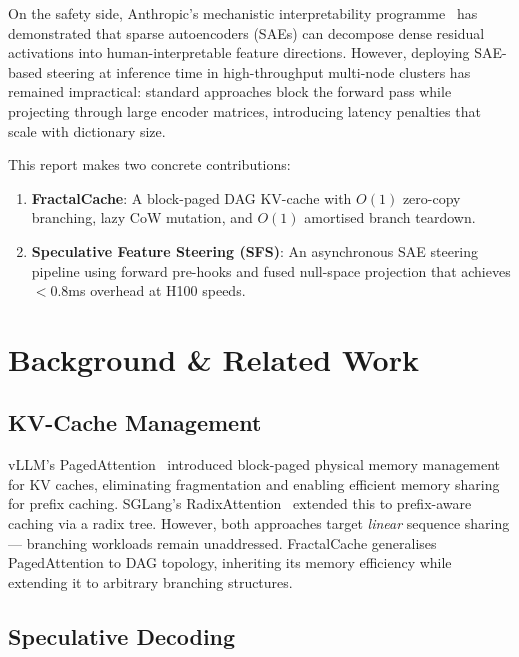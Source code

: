 \documentclass[10pt,twocolumn]{article}
\begin{document}
On the safety side, Anthropic's mechanistic interpretability programme~\cite{templeton2024scaling, cunningham2023sparse} has demonstrated that sparse autoencoders (SAEs) can decompose dense residual activations into human-interpretable feature directions. However, deploying SAE-based steering at inference time in high-throughput multi-node clusters has remained impractical: standard approaches block the forward pass while projecting through large encoder matrices, introducing latency penalties that scale with dictionary size.

This report makes two concrete contributions:

\begin{enumerate}[leftmargin=*]
    \item \textbf{FractalCache}: A block-paged DAG KV-cache with $O(1)$ zero-copy branching, lazy CoW mutation, and $O(1)$ amortised branch teardown.
    \item \textbf{Speculative Feature Steering (SFS)}: An asynchronous SAE steering pipeline using forward pre-hooks and fused null-space projection that achieves $<0.8$ms overhead at H100 speeds.
\end{enumerate}

\section{Background \& Related Work}

\subsection{KV-Cache Management}

vLLM's PagedAttention~\cite{kwon2023vllm} introduced block-paged physical memory management for KV caches, eliminating fragmentation and enabling efficient memory sharing for prefix caching. SGLang's RadixAttention~\cite{zheng2024sglang} extended this to prefix-aware caching via a radix tree. However, both approaches target \emph{linear} sequence sharing — branching workloads remain unaddressed. FractalCache generalises PagedAttention to DAG topology, inheriting its memory efficiency while extending it to arbitrary branching structures.

\subsection{Speculative Decoding}
\end{document}
